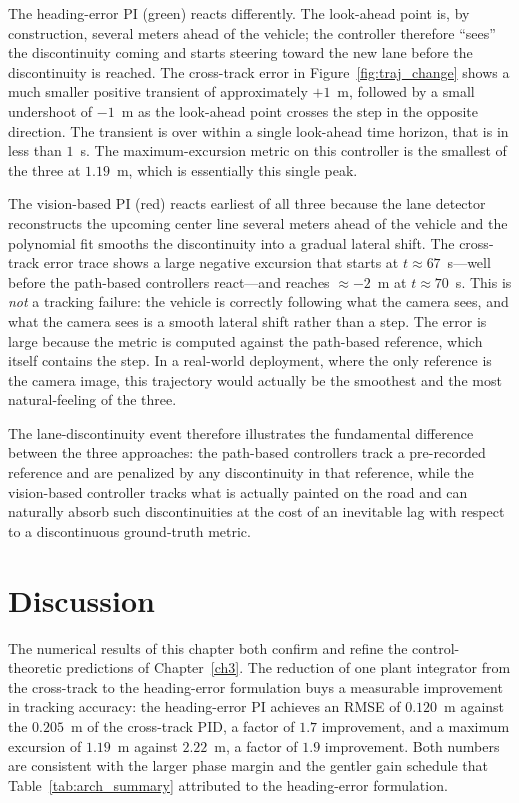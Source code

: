 The heading-error PI (green) reacts differently. The look-ahead point is, by construction, several meters ahead of the vehicle; the controller therefore \enquote{sees} the discontinuity coming and starts steering toward the new lane before the discontinuity is reached. The cross-track error in Figure~\ref{fig:traj_change} shows a much smaller positive transient of approximately $+1$~m, followed by a small undershoot of $-1$~m as the look-ahead point crosses the step in the opposite direction. The transient is over within a single look-ahead time horizon, that is in less than $1$~s. The maximum-excursion metric on this controller is the smallest of the three at $1.19$~m, which is essentially this single peak.

The vision-based PI (red) reacts earliest of all three because the lane detector reconstructs the upcoming center line several meters ahead of the vehicle and the polynomial fit smooths the discontinuity into a gradual lateral shift. The cross-track error trace shows a large negative excursion that starts at $t \approx 67$~s---well before the path-based controllers react---and reaches $\approx -2$~m at $t \approx 70$~s. This is \emph{not} a tracking failure: the vehicle is correctly following what the camera sees, and what the camera sees is a smooth lateral shift rather than a step. The error is large because the metric is computed against the path-based reference, which itself contains the step. In a real-world deployment, where the only reference is the camera image, this trajectory would actually be the smoothest and the most natural-feeling of the three.

The lane-discontinuity event therefore illustrates the fundamental difference between the three approaches: the path-based controllers track a pre-recorded reference and are penalized by any discontinuity in that reference, while the vision-based controller tracks what is actually painted on the road and can naturally absorb such discontinuities at the cost of an inevitable lag with respect to a discontinuous ground-truth metric.

\section{Discussion}
\label{sec:discussion}
The numerical results of this chapter both confirm and refine the control-theoretic predictions of Chapter~\ref{ch3}. The reduction of one plant integrator from the cross-track to the heading-error formulation buys a measurable improvement in tracking accuracy: the heading-error PI achieves an \ac{RMSE} of $0.120$~m against the $0.205$~m of the cross-track PID, a factor of $1.7$ improvement, and a maximum excursion of $1.19$~m against $2.22$~m, a factor of $1.9$ improvement. Both numbers are consistent with the larger phase margin and the gentler gain schedule that Table~\ref{tab:arch_summary} attributed to the heading-error formulation.

